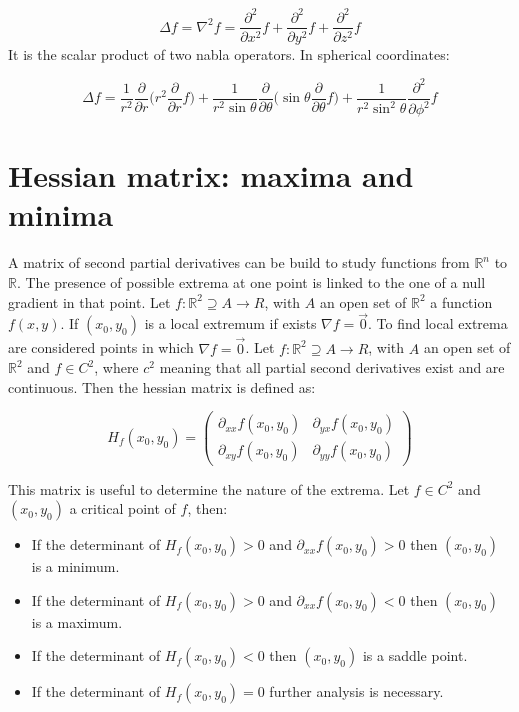 	$$\Delta f = \nabla^2 f = \frac{\partial^2}{\partial x^2}f + \frac{\partial^2}{\partial y^2}f + \frac{\partial^2}{\partial z^2}f$$
	It is the scalar product of two nabla operators.
	In spherical coordinates:

	$$\Delta f = \frac{1}{r^2}\frac{\partial}{\partial r}\biggl(r^2\frac{\partial}{\partial r}f\biggr) + \frac{1}{r^2\sin\theta}\frac{\partial}{\partial\theta}\biggl(\sin\theta\frac{\partial}{\partial\theta}f\biggr) + \frac{1}{r^2\sin^2\theta}\frac{\partial^2}{\partial\phi^2}f$$

\section{Hessian matrix: maxima and minima}
A matrix of second partial derivatives can be build to study functions from $\mathbb{R}^n$ to $\mathbb{R}$.
The presence of possible extrema at one point is linked to the one of a null gradient in that point.
Let $f:\mathbb{R}^2\supseteq A\rightarrow{R}$, with $A$ an open set of $\mathbb{R}^2$ a function $f(x,y)$.
If $(x_0, y_0)$ is a local extremum if exists $\nabla f = \vec{0}$.
To find local extrema are considered points in which $\nabla f = \vec{0}$.
Let $f:\mathbb{R}^2\supseteq A\rightarrow{R}$, with $A$ an open set of $\mathbb{R}^2$ and $f\in C^2$, where $c^2$ meaning that all partial second derivatives exist and are continuous.
Then the hessian matrix is defined as:

$$H_f(x_0, y_0) = \begin{pmatrix} \partial_{xx} f(x_0, y_0) & \partial_{yx}f(x_0, y_0) \\ \partial_{xy} f(x_0, y_0) & \partial_{yy}f(x_0, y_0)\end{pmatrix}$$

This matrix is useful to determine the nature of the extrema.
Let $f\in C^2$ and $(x_0, y_0)$ a critical point of $f$, then:

\begin{multicols}{2}
	\begin{itemize}
		\item If the determinant of $H_f(x_0, y_0) >0$ and $\partial_{xx}f(x_0, y_0) > 0$ then $(x_0, y_0)$ is a minimum.
		\item If the determinant of $H_f(x_0, y_0) >0$ and $\partial_{xx}f(x_0, y_0) < 0$ then $(x_0, y_0)$ is a maximum.
		\item If the determinant of $H_f(x_0, y_0)<0$ then $(x_0, y_0)$ is a saddle point.
		\item If the determinant of $H_f(x_0,y_0) = 0$ further analysis is necessary.
	\end{itemize}
\end{multicols}


